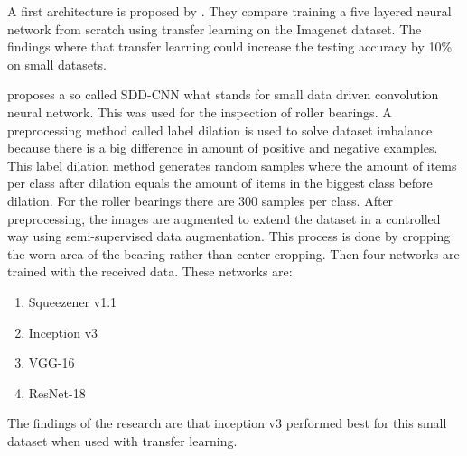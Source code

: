 	A first architecture is proposed by \cite{Chandrarathne2019}. They compare training a five layered neural network from scratch using transfer learning on the Imagenet dataset. The findings where that transfer learning could increase the testing accuracy by 10\% on small datasets.
	
	\cite{Xu2019} proposes a so called SDD-CNN what stands for small data driven convolution neural network. This was used for the inspection of roller bearings. A preprocessing method called label dilation is used to solve dataset imbalance because there is a big difference in amount of positive and negative examples. This label dilation method generates random samples where the amount of items per class after dilation equals the amount of items in the biggest class before dilation. For the roller bearings there are 300 samples per class. After preprocessing, the images are augmented to extend the dataset in a controlled way using semi-supervised data augmentation. This process is done by cropping the worn area of the bearing rather than center cropping. Then four networks are trained with the received data. These networks are: 
	\begin{enumerate}
	\item Squeezener v1.1
	\item Inception v3
	\item VGG-16 
	\item ResNet-18
	\end{enumerate}

The findings of the research are that inception v3 performed best for this small dataset when used with transfer learning.


			